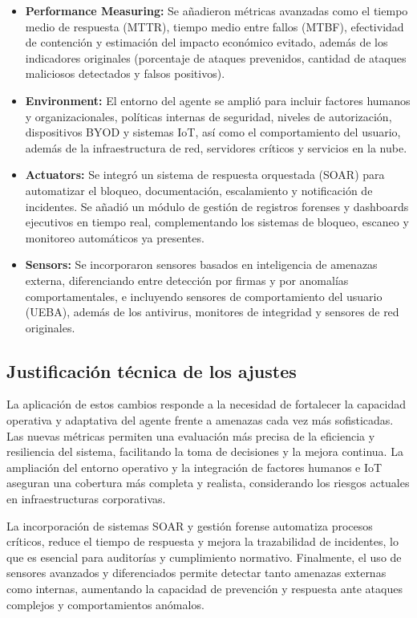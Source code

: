 \documentclass[letterpaper, 12pt]{report}
\begin{document}
\begin{itemize}
      \item \textbf{Performance Measuring:} Se añadieron métricas avanzadas como el tiempo medio de respuesta (MTTR), tiempo medio
            entre fallos (MTBF), efectividad de contención y estimación del impacto económico evitado, además de los indicadores
            originales (porcentaje de ataques prevenidos, cantidad de ataques maliciosos detectados y falsos positivos).
      \item \textbf{Environment:} El entorno del agente se amplió para incluir factores humanos y organizacionales, políticas
            internas de seguridad, niveles de autorización, dispositivos BYOD y sistemas IoT, así como el comportamiento del usuario, además
            de la infraestructura de red, servidores críticos y servicios en la nube.
      \item \textbf{Actuators:} Se integró un sistema de respuesta orquestada (SOAR) para automatizar el bloqueo, documentación,
            escalamiento y notificación de incidentes. Se añadió un módulo de gestión de registros forenses y dashboards ejecutivos en
            tiempo real, complementando los sistemas de bloqueo, escaneo y monitoreo automáticos ya presentes.
      \item \textbf{Sensors:} Se incorporaron sensores basados en inteligencia de amenazas externa, diferenciando entre
            detección por firmas y por anomalías comportamentales, e incluyendo sensores de comportamiento del usuario (UEBA), además
            de los antivirus, monitores de integridad y sensores de red originales.
\end{itemize}

\subsection{Justificación técnica de los ajustes}

La aplicación de estos cambios responde a la necesidad de fortalecer la
capacidad operativa y adaptativa del agente frente a amenazas cada vez más
sofisticadas. Las nuevas métricas permiten una evaluación más precisa de la
eficiencia y resiliencia del sistema, facilitando la toma de decisiones y la
mejora continua. La ampliación del entorno operativo y la integración de
factores humanos e IoT aseguran una cobertura más completa y realista,
considerando los riesgos actuales en infraestructuras corporativas.

La incorporación de sistemas SOAR y gestión forense automatiza procesos
críticos, reduce el tiempo de respuesta y mejora la trazabilidad de incidentes,
lo que es esencial para auditorías y cumplimiento normativo. Finalmente, el uso
de sensores avanzados y diferenciados permite detectar tanto amenazas externas
como internas, aumentando la capacidad de prevención y respuesta ante ataques
complejos y comportamientos anómalos.
\end{document}
